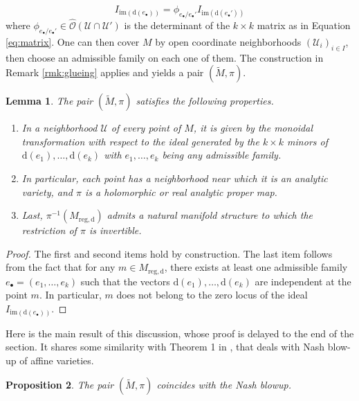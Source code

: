 \documentclass[10pt]{article}
\theoremstyle{plain}
\newtheorem{lemma}{Lemma}[section]
\newtheorem{proposition}[lemma]{Proposition}
\theoremstyle{definition}
\theoremstyle{remark}
\newcommand{\dd}{\mathrm{d}}
\begin{document}
 \begin{equation}\label{eq:changeadmissible}  I_{{\mathrm{im}}(\dd(e_\bullet))} = \phi_{e_\bullet / e_\bullet'}   I_{{\mathrm{im}}(\dd(e_\bullet'))}   \end{equation}
 where $\phi_{e_\bullet / e_\bullet'}  \in \hat{\mathcal O}(\mathcal U \cap \mathcal U')$ is the determinant of the $k \times k$ matrix as in Equation \eqref{eq:matrix}.
One can then cover  $M$ by open coordinate neighborhoods $(\mathcal U_i)_{i \in I} $, then choose an admissible family on each one of them. 
The construction in Remark \ref{rmk:glueing} applies and yields a pair $ (\tilde{M},\pi)$.

\begin{lemma}
The pair $ (\tilde{M},\pi)$ satisfies the following properties.
\begin{enumerate}
\item In a neighborhood $ \mathcal U$ of every point of $M$, it is given by the monoidal transformation with respect to the ideal generated by the $k \times k$ minors of $\dd(e_1), \dots, \dd(e_k)$ with $ e_1, \dots, e_k$ being \emph{any} admissible family. 
\item In particular, each point has a neighborhood near which it is an analytic variety, and $ \pi$ is a holomorphic or real analytic proper map.
\item Last, $ \pi^{-1}(M_{\mathrm{reg},\dd})$ admits a natural manifold structure to which the restriction of $ \pi$ is invertible.
\end{enumerate}
\end{lemma}
\begin{proof}
The first and second items hold by construction. The last item follows from the fact that for any $m \in M_{\mathrm{reg},\dd}$, there exists at least one admissible family $e_\bullet=(e_1, \dots,e_k)$ such that the vectors $\dd(e_1), \dots, \dd(e_k)$ are independent at the point $m$. In particular, $m $ does not belong to the zero locus of the ideal $I_{{\mathrm{im}}(\dd(e_\bullet))} $.
\end{proof}

Here is the main result of this discussion, whose proof is delayed to the end of the section.
It shares some similarity with Theorem 1 in \cite{zbMATH05707343}, that deals with Nash blow-up of affine varieties.

 \begin{proposition}
 \label{prop:thisisNash}
The pair  $ (\tilde{M},\pi)$ coincides with the Nash blowup. 
 \end{proposition}
\end{document}
